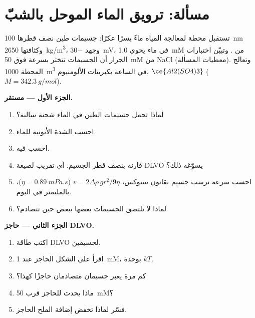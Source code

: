 \clearpage
\enlargethispage{3\baselineskip}
\section{مسألة: ترويق الماء الموحل بالشبّ}

\begin{problem}
\label{pb:b3:colloids:1}
تستقبل محطة لمعالجة المياه ماءً يسرًا عكرًا: جسيمات طين نصف قطرها
\qty{100}{nm} وكثافتها \qty{2650}{kg/m^3}، وجهد  \qty{-30}{mV}، في
ماء يحوي \qty{1.0}{mM} من . وتبيّن اختبارات الجرار أن الجسيمات تتخثر
بسرعة فوق \qty{50}{mM} من NaCl (معطيات المسألة). وتعالج المحطة \qty{1000}{m^3} في
الساعة بكبريتات الألومنيوم، $\ce{Al2(SO4)3}$ ($M = \qty{342.3}{g/mol}$).

\medskip\noindent\textbf{الجزء الأول ---  مستقر.}
\begin{enumerate}
  \item لماذا تحمل جسيمات الطين في الماء شحنة سالبة؟
  \item احسب الشدة الأيونية للماء.
  \item احسب  فيه.
  \item قارنه بنصف قطر الجسيم. أي تقريب لصيغة DLVO
        يسوّغه ذلك؟
  \item احسب سرعة ترسب جسيم بقانون ستوكس، $v =
        2\Delta\rho\,gr^2/9\eta$ ($\eta = \qty{0.89}{mPa.s}$)، بالمليمتر في اليوم.
  \item لماذا لا تلتصق الجسيمات بعضها ببعض حين تتصادم؟
\end{enumerate}

\medskip\noindent\textbf{الجزء الثاني --- حاجز DLVO.}
\begin{enumerate}[resume]
  \item اكتب طاقة DLVO لجسيمين.
  \item اقرأ على الشكل الحاجز عند \qty{1}{mM}، بوحدة $kT$.
  \item كم مرة يعبر جسيمان متصادمان حاجزًا كهذا؟
  \item ماذا يحدث للحاجز قرب \qty{50}{mM}؟
  \item فسّر لماذا تخفض إضافة الملح الحاجز.
\end{enumerate}


\end{problem}
